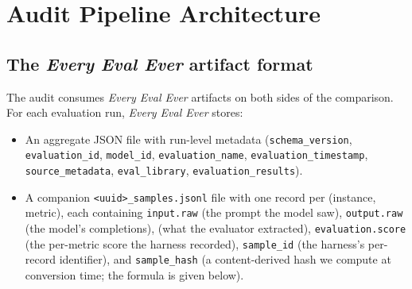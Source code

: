 \documentclass[11pt]{article}
\newcommand{\eee}{\textit{Every Eval Ever}\xspace}
\begin{document}
\section{Audit Pipeline Architecture}
\label{sec:tr-pipeline}

\subsection{The \eee{} artifact format}
\label{sec:tr-eee-format}

The audit consumes \eee{} artifacts on both sides of the comparison.
For each evaluation run, \eee{} stores:
\begin{itemize}
  \item An aggregate JSON file with run-level metadata
        (\texttt{schema\_version}, \texttt{evaluation\_id},
        \texttt{model\_id}, \texttt{evaluation\_name},
        \texttt{evaluation\_timestamp}, \texttt{source\_metadata},
        \texttt{eval\_library},
        \texttt{evaluation\_results}).
  \item A companion \texttt{<uuid>\_samples.jsonl} file with one
        record per (instance, metric), each containing
        \texttt{input.raw} (the prompt the model saw),
        \texttt{output.raw} (the model's completions),
         (what the
        evaluator extracted),
        \texttt{evaluation.score} (the per-metric score the harness
        recorded),
        \texttt{sample\_id} (the harness's per-record identifier),
        and \texttt{sample\_hash} (a content-derived hash we compute
        at conversion time; the formula is given below).
\end{itemize}
\end{document}
